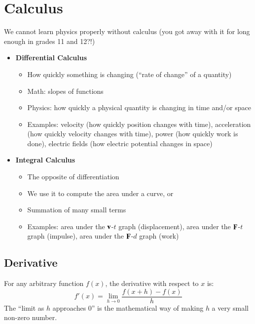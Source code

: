 \documentclass{../../oss-handout}
\newcommand{\mb}[1]{\ensuremath\mathbf{#1}}
\begin{document}
\section{Calculus}
We cannot learn physics properly without calculus (you got away with it for
long enough in grades 11 and 12?!)
%
\begin{itemize}
\item\textbf{Differential Calculus}
  \begin{itemize}
  \item How quickly something is changing (``rate of change'' of a quantity)
  \item Math: slopes of functions
  \item Physics: how quickly a physical quantity is changing in time and/or
    space
  \item Examples: velocity (how quickly position changes with time),
    acceleration (how quickly velocity changes with time), power (how quickly
    work is done), electric fields (how electric potential changes in space)
  \end{itemize}
\item\textbf{Integral Calculus}
  \begin{itemize}
  \item The opposite of differentiation
  \item We use it to compute the area under a curve, or
  \item Summation of many small terms
  \item Examples: area under the $\mb{v}$-$t$ graph (displacement), area
    under the $\mb{F}$-$t$ graph (impulse), area under the $\mb{F}$-$d$ graph
    (work)
  \end{itemize}
\end{itemize}


\subsection{Derivative}

For any arbitrary function $f(x)$, the derivative with respect to $x$ is:
\begin{equation*}
  f'(x)=\lim_{h\rightarrow 0}\frac{f(x+h)-f(x)}{h}
\end{equation*}
The ``limit as $h$ approaches $0$'' is the mathematical way of making $h$ a
very small non-zero number.
\end{document}
